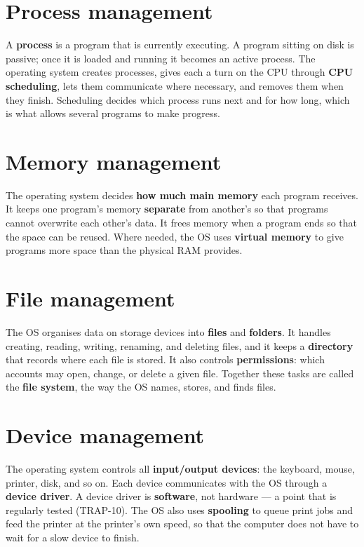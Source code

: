 \section{Process management}
A \textbf{process} is a program that is currently executing. A program sitting
on disk is passive; once it is loaded and running it becomes an active
process. The operating system creates processes, gives each a turn on the CPU
through \textbf{CPU scheduling}, lets them communicate where necessary, and
removes them when they finish. Scheduling decides which process runs next and
for how long, which is what allows several programs to make progress.

\section{Memory management}
The operating system decides \textbf{how much main memory} each program
receives. It keeps one program's memory \textbf{separate} from another's so
that programs cannot overwrite each other's data. It frees memory when a
program ends so that the space can be reused. Where needed, the OS uses
\textbf{virtual memory} to give programs more space than the physical RAM
provides.

\section{File management}
The OS organises data on storage devices into \textbf{files} and
\textbf{folders}. It handles creating, reading, writing, renaming, and deleting
files, and it keeps a \textbf{directory} that records where each file is
stored. It also controls \textbf{permissions}: which accounts may open, change,
or delete a given file. Together these tasks are called the \textbf{file
system}, the way the OS names, stores, and finds files.

\section{Device management}
The operating system controls all \textbf{input/output devices}: the keyboard,
mouse, printer, disk, and so on. Each device communicates with the OS through a
\textbf{device driver}. A device driver is \textbf{software}, not hardware ---
a point that is regularly tested (TRAP-10). The OS also uses \textbf{spooling}
to queue print jobs and feed the printer at the printer's own speed, so that
the computer does not have to wait for a slow device to finish.

